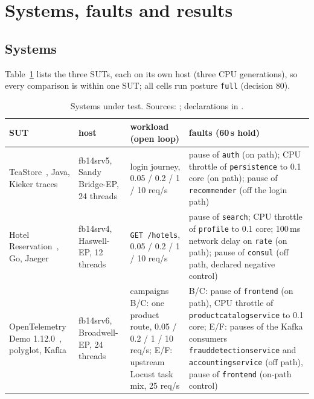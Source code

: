 \documentclass{ceurart}
\begin{document}
\section{Systems, faults and results}\label{sec:results}

\subsection{Systems}\label{sec:systems}
Table~\ref{tab:systems} lists the three SUTs, each on its own host (three CPU generations), so every comparison is
within one SUT; all cells run posture \texttt{full} (decision 80).

\begin{table}[t]
\caption{Systems under test. Sources: \protect{}; declarations in \protect{}.}
\label{tab:systems}
\footnotesize
\begin{tabular}{@{}>{\raggedright\arraybackslash}p{2.2cm}>{\raggedright\arraybackslash}p{2.4cm}>{\raggedright\arraybackslash}p{3.6cm}>{\raggedright\arraybackslash}p{6.2cm}@{}}
\toprule
SUT & host & workload (open loop) & faults (60\,s hold) \\
\midrule
TeaStore~\cite{vonkistowski_teastore_2018}, Java, Kieker traces~\cite{vanhoorn_kieker_2012}
  & fb14srv5, Sandy Bridge-EP, 24 threads
  & login journey, 0.05 / 0.2 / 1 / 10 req/s
  & pause of \texttt{auth} (on path); CPU throttle of \texttt{persistence} to 0.1 core (on path); pause of
    \texttt{recommender} (off the login path) \\
Hotel Reservation~\cite{gan_open-source_2019}, Go, Jaeger~\cite{jaeger}
  & fb14srv4, Haswell-EP, 12 threads
  & \texttt{GET /hotels}, 0.05 / 0.2 / 1 / 10 req/s
  & pause of \texttt{search}; CPU throttle of \texttt{profile} to 0.1 core; 100\,ms network delay on \texttt{rate}
    (on path); pause of \texttt{consul} (off path, declared negative control) \\
OpenTelemetry Demo 1.12.0~\cite{opentelemetry_demo}, polyglot, Kafka
  & fb14srv6, Broadwell-EP, 24 threads
  & campaigns B/C: one product route, 0.05 / 0.2 / 1 / 10 req/s; E/F: upstream Locust task mix, 25 req/s
  & B/C: pause of \texttt{frontend} (on path), CPU throttle of \texttt{productcatalogservice} to 0.1 core; E/F:
    pauses of the Kafka consumers \texttt{frauddetectionservice} and \texttt{accountingservice} (off path), pause
    of \texttt{frontend} (on-path control) \\
\bottomrule
\end{tabular}
\end{table}
\end{document}

